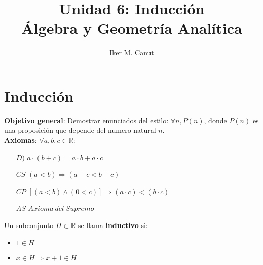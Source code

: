 \documentclass[11pt,a4paper]{article}
\author{Iker M. Canut}
\title{Unidad 6: Inducci\'on\\\'Algebra y Geometr\'ia Anal\'itica}
\begin{document}
\maketitle
\newpage
\section{Inducci\'on}
\textbf{Objetivo general}: Demostrar enunciados del estilo: $\forall n, P(n)$, donde $P(n)$ es una proposici\'on que depende del numero natural $n$.\\

\textbf{Axiomas}: $\forall a,b,c \in \mathbb{R}$:
\begin{enumerate}
\item [$D)$] $a \cdot (b + c) = a \cdot b + a \cdot c$
\item [$CS$] $(a < b) \Rightarrow (a+c < b+c)$
\item [$CP$] $[(a < b) \land (0 < c)] \Rightarrow (a \cdot c) < (b \cdot c)$
\item [$AS$] $Axioma\ del\ Supremo$
\end{enumerate}

\noindent \dotfill

Un subconjunto $H \subset \mathbb{R}$ se llama \textbf{inductivo} si:
\begin{itemize}
\item $1 \in H$
\item $x \in H \Rightarrow x+1 \in H$
\end{itemize}
\end{document}
